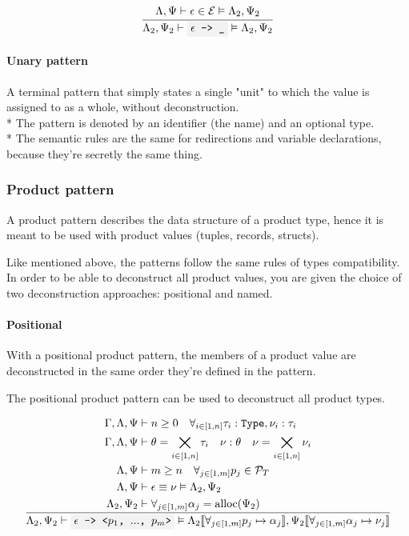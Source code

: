 \documentclass[11pt]{report}
\newcommand{\oprule}[3][gathered]{\frac{\begin{#1}#2\end{#1}}{\begin{gathered}#3\end{gathered}}}
\newcommand{\then}{\vdash}
\newcommand{\Then}{\vDash}
\newcommand{\code}[1]{\texttt{\colorbox{gray!10}{#1}}}
\newcommand{\alloc}{\mathrm{alloc}}
\newcommand{\addr}{\alpha}
\newcommand{\expr}{\epsilon}
\newcommand{\val}{\nu}
\newcommand{\pattern}{p}
\newcommand{\Expr}{\mathcal{E}}
\newcommand{\Pattern}{\mathcal{P}}
\newcommand{\PatternTerminal}{\Pattern_T}
\newcommand{\Type}{\texttt{Type}}
\newcommand{\env}[1]{[\![#1]\!]}
\newcommand{\Env}{\Gamma}
\newcommand{\EnvLoc}{\Lambda}
\newcommand{\EnvStore}{\Psi}
\theoremstyle{definition}
\begin{document}
\[
	\oprule{
		\EnvLoc,\EnvStore \then \expr \in \Expr \Then \EnvLoc_2,\EnvStore_2
	}{
		\EnvLoc_2,\EnvStore_2 \then \code{$\expr$ -> \_} \Then \EnvLoc_2,\EnvStore_2
	}
\]

\paragraph{Unary pattern} A terminal pattern that simply states a single "unit"
to which the value is assigned to as a whole, without deconstruction.\\*
The pattern is denoted by an identifier (the name) and an optional type.\\*
The semantic rules are the same for redirections and variable declarations,
because they're secretly the same thing.

\subsubsection{Product pattern}

A product pattern describes the data structure of a product type, hence it is
meant to be used with product values (tuples, records, structs).

Like mentioned above, the patterns follow the same rules of types
compatibility. In order to be able to deconstruct all product values, you are
given the choice of two deconstruction approaches: positional and named.

\paragraph{Positional}

With a positional product pattern, the members of a product value are
deconstructed in the same order they're defined in the pattern.

The positional product pattern can be used to deconstruct all product types.

\[
	\oprule[aligned]{
		\Env,\EnvLoc,\EnvStore &\then n \geq 0 \quad \forall_{i\in[1,n]}{\tau_i:\Type,\val_i:\tau_i} \\*
		\Env,\EnvLoc,\EnvStore &\then \theta = \bigtimes_{i\in[1,n]}{\tau_i} \quad \val:\theta \quad \val = \bigtimes_{i \in [1,n]}{\val_i} \\*
		\EnvLoc,\EnvStore      &\then m \geq n \quad \forall_{j\in[1,m]}{\pattern_j\in\PatternTerminal} \\*
		\EnvLoc,\EnvStore      &\then \expr \equiv \val \Then \EnvLoc_2,\EnvStore_2 \\*
		\EnvLoc_2,\EnvStore_2  &\then \forall_{j\in[1,m]}{\addr_j = \alloc(\EnvStore_2)} \\*
	}{
		\EnvLoc_2,\EnvStore_2 \then \code{$\expr$ -> <$\pattern_1$, $...$, $\pattern_m$>} \Then \EnvLoc_2\env{\forall_{j\in[1,m]}{\pattern_j\mapsto\addr_j}},\EnvStore_2\env{\forall_{j\in[1,m]}{\addr_j\mapsto\val_j}}
	}
\]
\end{document}
